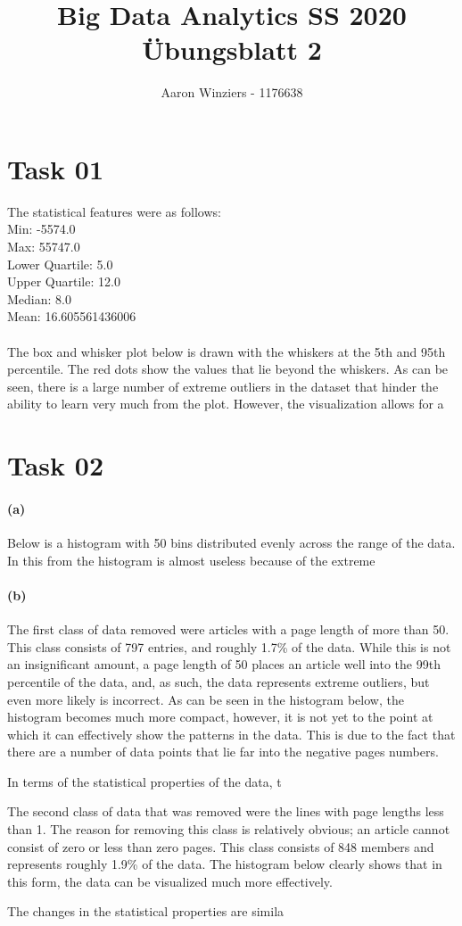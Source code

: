 \documentclass[11pt,a4paper,parskip=half ]{scrartcl}
\author{Aaron Winziers - 1176638}
\title{Big Data Analytics SS 2020\\\LARGE{Übungsblatt 2}}
\begin{document}
	\maketitle
	
\section*{Task 01}
The statistical features were as follows: \\
Min: -5574.0 \\
Max: 55747.0 \\
Lower Quartile: 5.0 \\
Upper Quartile: 12.0 \\
Median: 8.0 \\
Mean: 16.605561436006 \\ ~\\
The box and whisker plot below is drawn with the whiskers at the 5th and 95th percentile. The red dots show the values that lie beyond the whiskers. As can be seen, there is a large number of extreme outliers in the dataset that hinder the ability to learn very much from the plot. However, the visualization allows for a 

\newpage
\section*{Task 02}
\paragraph{(a)}Below is a histogram with 50 bins distributed evenly across the range of the data. In this from the histogram is almost useless because of the extreme

\paragraph{(b)} The first class of data removed were articles with a page length of more than 50. This class consists of 797 entries, and roughly 1.7\% of the data. While this is not an insignificant amount, a page length of 50 places an article well into the 99th percentile of the data, and, as such, the data represents extreme outliers, but even more likely is incorrect. As can be seen in the histogram below, the histogram becomes much more compact, however, it is not yet to the point at which it can effectively show the patterns in the data. This is due to the fact that there are a number of data points that lie far into the negative pages numbers.

In terms of the statistical properties of the data, t

The second class of data that was removed were the lines with page lengths less than 1. The reason for removing this class is relatively obvious; an article cannot consist of zero or less than zero pages. This class consists of 848 members and represents roughly 1.9\% of the data. The histogram below clearly shows that in this form, the data can be visualized much more effectively.

The changes in the statistical properties are simila
	
	
\end{document}
